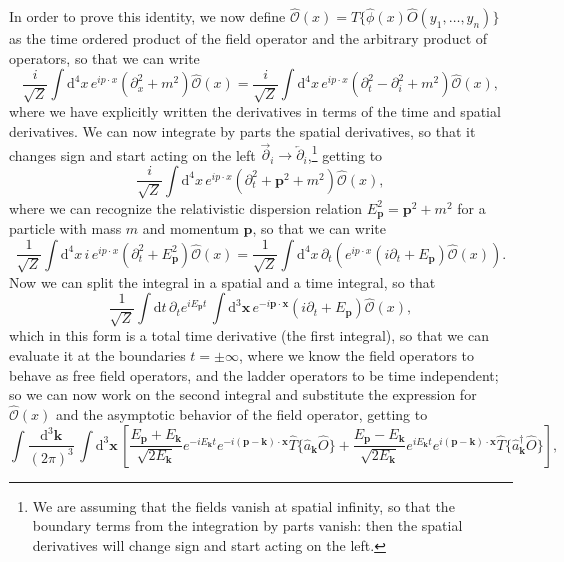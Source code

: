 In order to prove this identity, we now define \(\hat{\mathcal{O}}(x) = \hat{T} \{\hat{\phi}(x) \hat{O} (y_1,\ldots,y_n)\}\) as the time ordered product of the field operator and the arbitrary product of operators, so that we can write
\[
    \frac{i}{\sqrt{Z}} \int \mathrm{d}^4 x \, e^{ip \cdot x} (\partial_x^2 + m^2) \hat{\mathcal{O}}(x) = \frac{i}{\sqrt{Z}} \int \mathrm{d}^4 x \, e^{ip \cdot x} (\partial_t^2 - \partial_i^2 + m^2) \hat{\mathcal{O}}(x),
\]
where we have explicitly written the derivatives in terms of the time and spatial derivatives. We can now integrate by parts the spatial derivatives, so that it changes sign and start acting on the left \(\overrightarrow{\partial}_i \to \overleftarrow{\partial}_i\),\footnote{We are assuming that the fields vanish at spatial infinity, so that the boundary terms from the integration by parts vanish: then the spatial derivatives will change sign and start acting on the left.} getting to
\[
    \frac{i}{\sqrt{Z}} \int \mathrm{d}^4 x \, e^{ip \cdot x} (\partial_t^2 + \mathbf{p}^2 + m^2) \hat{\mathcal{O}}(x),
\]
where we can recognize the relativistic dispersion relation \(E_{\mathbf{p}}^2 = \mathbf{p}^2 + m^2\) for a particle with mass \(m\) and momentum \(\mathbf{p}\), so that we can write
\[
    \frac{1}{\sqrt{Z}} \int \mathrm{d}^4 x \, i \, e^{ip \cdot x} (\partial_t^2 + E_{\mathbf{p}}^2) \hat{\mathcal{O}}(x) = \frac{1}{\sqrt{Z}} \int \mathrm{d}^4 x \, \partial_t \left( e^{ip \cdot x} (i \partial_t + E_{\mathbf{p}}) \hat{\mathcal{O}}(x) \right).
\]
Now we can split the integral in a spatial and a time integral, so that
\[
    \frac{1}{\sqrt{Z}} \int \mathrm{d} t \, \partial_t e^{i E_{\mathbf{p}} t} \, \int \mathrm{d}^3 \mathbf{x} \, e^{- i \mathbf{p} \cdot \mathbf{x}} (i \partial_t + E_{\mathbf{p}}) \hat{\mathcal{O}}(x),
\]
which in this form is a total time derivative (the first integral), so that we can evaluate it at the boundaries \(t = \pm \infty\), where we know the field operators to behave as free field operators, and the ladder operators to be time independent; so we can now work on the second integral and substitute the expression for \(\hat{\mathcal{O}}(x)\) and the asymptotic behavior of the field operator, getting to
\[
    \int \frac{\mathrm{d}^3 \mathbf{k}}{(2\pi)^3} \, \int \mathrm{d}^3 \mathbf{x} \, \left[ \frac{E_{\mathbf{p}} + E_{\mathbf{k}}}{\sqrt{2E_{\mathbf{k}}}} e^{-i E_{\mathbf{k}} t} e^{-i (\mathbf{p} - \mathbf{k}) \cdot \mathbf{x}} \hat{T} \{ \hat{a}_{\mathbf{k}} \hat{O} \} + \frac{E_{\mathbf{p}} - E_{\mathbf{k}}}{\sqrt{2E_{\mathbf{k}}}} e^{i E_{\mathbf{k}} t} e^{i (\mathbf{p} - \mathbf{k}) \cdot \mathbf{x}} \hat{T} \{ \hat{a}_{\mathbf{k}}^\dagger \hat{O} \} \right],
\]
